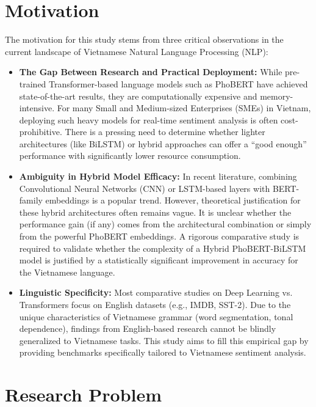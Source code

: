 \documentclass[12pt]{report} %
\begin{document}
\section{Motivation}

The motivation for this study stems from three critical observations in the current landscape of Vietnamese Natural Language Processing (NLP):

\begin{itemize}
    \item \textbf{The Gap Between Research and Practical Deployment:} While pre-trained Transformer-based language models such as PhoBERT have achieved state-of-the-art results, they are computationally expensive and memory-intensive. For many Small and Medium-sized Enterprises (SMEs) in Vietnam, deploying such heavy models for real-time sentiment analysis is often cost-prohibitive. There is a pressing need to determine whether lighter architectures (like BiLSTM) or hybrid approaches can offer a ``good enough'' performance with significantly lower resource consumption.

    \item \textbf{Ambiguity in Hybrid Model Efficacy:} In recent literature, combining Convolutional Neural Networks (CNN) or LSTM-based layers with BERT-family embeddings is a popular trend. However, theoretical justification for these hybrid architectures often remains vague. It is unclear whether the performance gain (if any) comes from the architectural combination or simply from the powerful PhoBERT embeddings. A rigorous comparative study is required to validate whether the complexity of a Hybrid PhoBERT-BiLSTM model is justified by a statistically significant improvement in accuracy for the Vietnamese language.

    \item \textbf{Linguistic Specificity:} Most comparative studies on Deep Learning vs. Transformers focus on English datasets (e.g., IMDB, SST-2). Due to the unique characteristics of Vietnamese grammar (word segmentation, tonal dependence), findings from English-based research cannot be blindly generalized to Vietnamese tasks. This study aims to fill this empirical gap by providing benchmarks specifically tailored to Vietnamese sentiment analysis.
\end{itemize}

\section{Research Problem}
\end{document}
